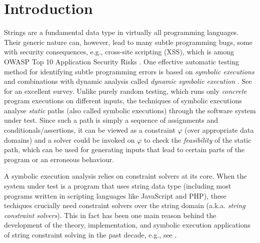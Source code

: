 
\section{Introduction}
\label{sec:intro}

Strings are a fundamental data type in virtually all programming languages.
Their generic nature can, however, lead to many subtle programming 
bugs, some with security consequences, e.g., cross-site scripting
(XSS), which is among OWASP Top 10 Application Security Risks
\cite{owasp17}. One effective
automatic testing method for identifying subtle programming errors
is based on \emph{symbolic executions} 
\cite{king76} and combinations with dynamic analysis
called \emph{dynamic symbolic execution} \cite{jalangi,DART,EXE,CUTE,KLEE}.
See \cite{symbex-survey} for an excellent survey. Unlike purely random testing,
which runs only \emph{concrete} program executions on different 
inputs, the techniques of symbolic executions analyse \emph{static} paths
(also called symbolic executions) through the software system under test.
Since such a path is simply a sequence of assignments and
conditionals/assertions, it can be viewed as a constraint $\varphi$ (over 
appropriate data domains) and a 
solver could be invoked on $\varphi$ to check the \emph{feasibility}
of the static path, which can be used for generating inputs that lead to 
certain parts of the program or an erroneous behaviour.

A symbolic execution analysis relies on constraint solvers at its core. When 
the system
under test is a program that uses string data type (including most programs 
written in scripting languages like JavaScript and PHP), these techiques 
crucially need constraint solvers over the string domain (a.k.a. \emph{string 
constraint solvers}). This in fact has been one main reason behind the development of
the theory, implementation, and symbolic execution applications of string constraint 
solving in the past decade, e.g., see 
\cite{BTV09,Berkeley-JavaScript,HAMPI,Stranger,Vijay-length,YABI14,Abdulla14,LB16,fang-yu-circuits,Abdulla17,CCHLW18,HJLRV18,S3,TCJ16,Z3-str,Z3-str2,cvc4,Saner,RVG12,jalangi,expose}.

